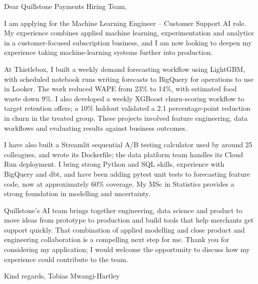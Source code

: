 \documentclass[11pt,a4paper]{article}
\begin{document}
Dear Quillstone Payments Hiring Team,

I am applying for the Machine Learning Engineer – Customer Support AI role. My experience combines applied machine learning, experimentation and analytics in a customer-focused subscription business, and I am now looking to deepen my experience taking machine-learning systems further into production.

At Thistlebox, I built a weekly demand forecasting workflow using LightGBM, with scheduled notebook runs writing forecasts to BigQuery for operations to use in Looker. The work reduced WAPE from 23\% to 14\%, with estimated food waste down 9\%. I also developed a weekly XGBoost churn-scoring workflow to target retention offers; a 10\% holdout validated a 2.1 percentage-point reduction in churn in the treated group. These projects involved feature engineering, data workflows and evaluating results against business outcomes.

I have also built a Streamlit sequential A/B testing calculator used by around 25 colleagues, and wrote its Dockerfile; the data platform team handles its Cloud Run deployment. I bring strong Python and SQL skills, experience with BigQuery and dbt, and have been adding pytest unit tests to forecasting feature code, now at approximately 60\% coverage. My MSc in Statistics provides a strong foundation in modelling and uncertainty.

Quillstone’s AI team brings together engineering, data science and product to move ideas from prototype to production and build tools that help merchants get support quickly. That combination of applied modelling and close product and engineering collaboration is a compelling next step for me. Thank you for considering my application; I would welcome the opportunity to discuss how my experience could contribute to the team.

Kind regards,
Tobias Mwangi-Hartley
\end{document}
